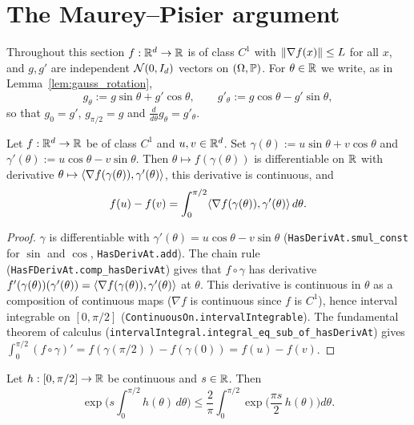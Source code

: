 \section{The Maurey--Pisier argument}
\label{sec:pre_concentration_mp}

Throughout this section $f : \mathbb{R}^d \to \mathbb{R}$ is of class $C^1$ with $\lVert \nabla f(x) \rVert \le L$
for all $x$, and $g, g'$ are independent $\mathcal{N}(0,I_d)$ vectors on $(\Omega,\mathbb{P})$. For
$\theta \in \mathbb{R}$ we write, as in Lemma~\ref{lem:gauss_rotation},
\[
  g_\theta := g\sin\theta + g'\cos\theta, \qquad g'_\theta := g\cos\theta - g'\sin\theta,
\]
so that $g_0 = g'$, $g_{\pi/2} = g$ and $\frac{d}{d\theta}g_\theta = g'_\theta$.

\begin{lemma}\label{lem:pc_interpolation_ftc}
\leanok
Let $f : \mathbb{R}^d \to \mathbb{R}$ be of class $C^1$ and $u, v \in \mathbb{R}^d$. Set
$\gamma(\theta) := u\sin\theta + v\cos\theta$ and $\gamma'(\theta) := u\cos\theta - v\sin\theta$.
Then $\theta \mapsto f(\gamma(\theta))$ is differentiable on $\mathbb{R}$ with derivative
$\theta \mapsto \langle \nabla f(\gamma(\theta)), \gamma'(\theta) \rangle$, this derivative is continuous,
and
\[
  f(u) - f(v) = \int_0^{\pi/2}\langle \nabla f(\gamma(\theta)), \gamma'(\theta) \rangle\,d\theta .
\]
\end{lemma}

\begin{proof}
\leanok
$\gamma$ is differentiable with $\gamma'(\theta) = u\cos\theta - v\sin\theta$
(\texttt{HasDerivAt.smul\_const} for $\sin$ and $\cos$, \texttt{HasDerivAt.add}). The chain
rule (\texttt{HasFDerivAt.comp\_hasDerivAt}) gives that $f\circ\gamma$ has derivative
$f'(\gamma(\theta))(\gamma'(\theta)) = \langle \nabla f(\gamma(\theta)), \gamma'(\theta) \rangle$ at
$\theta$. This derivative is continuous in $\theta$ as a composition of continuous maps
($\nabla f$ is continuous since $f$ is $C^1$), hence interval integrable on $[0,\pi/2]$
(\texttt{ContinuousOn.intervalIntegrable}). The fundamental theorem of calculus
(\texttt{intervalIntegral.integral\_eq\_sub\_of\_hasDerivAt}) gives
$\int_0^{\pi/2}(f\circ\gamma)' = f(\gamma(\pi/2)) - f(\gamma(0)) = f(u) - f(v)$.
\end{proof}

\begin{lemma}
\label{lem:pc_jensen_exp_average}
\leanok
Let $h : [0,\pi/2] \to \mathbb{R}$ be continuous and $s \in \mathbb{R}$. Then
\[
  \exp\Big(s\int_0^{\pi/2}h(\theta)\,d\theta\Big)
  \le \frac2\pi\int_0^{\pi/2}\exp\Big(\frac{\pi s}{2}\,h(\theta)\Big)d\theta .
\]
\end{lemma}

